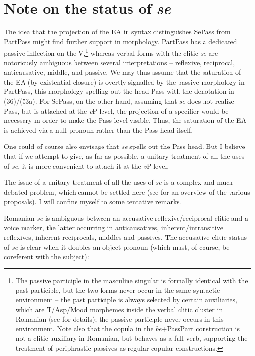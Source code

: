\documentclass[output=paper]{langsci/langscibook}
\begin{document}
\section{Note on the status of \textit{se}}%
The idea that the projection of the EA in syntax distinguishes SePass from PartPass might find further support in morphology. PartPass has a dedicated passive inflection on the V,\footnote{The passive participle in the masculine singular is formally identical with the past participle, but the two forms never occur in the same syntactic environment – the past participle is always selected by certain auxiliaries, which are T\slash Asp\slash Mood morphemes inside the verbal clitic cluster in Romanian (see \citet{Dobrovie-Sorin1994} for details); the passive participle never occurs in this environment. Note also that the copula in the \textit{be}+PassPart construction is not a clitic auxiliary in Romanian, but behaves as a full verb, supporting the treatment of periphrastic passives as regular copular constructions.}  whereas verbal forms with the clitic \textit{se} are notoriously ambiguous between several interpretations – reflexive, reciprocal, anticausative, middle, and passive. We may thus assume that the saturation of the EA (by existential closure) is overtly signalled by the passive morphology in PartPass, this morphology spelling out the head Pass with the denotation in (36)/(53a). For SePass, on the other hand, assuming that \textit{se} does not realize Pass, but is attached at the \textit{v}P-level, the projection of a specifier would be necessary in order to make the Pass-level visible. Thus, the saturation of the EA is achieved via a null pronoun rather than the Pass head itself.

One could of course also envisage that \textit{se} spells out the Pass head. But I believe that if we attempt to give, as far as possible, a unitary treatment of all the uses of \textit{se}, it is more convenient to  attach it at the \textit{v}P-level.

The issue of a unitary treatment of all the uses of \textit{se} is a complex and much-debated problem, which cannot be settled here (see \citealt{Dobrovie-Sorin2017} for an overview of the various proposals). I will confine myself to some tentative remarks.

Romanian \textit{se} is ambiguous between an accusative reflexive\slash reciprocal clitic and a voice marker, the latter occurring in anticausatives, inherent\slash intransitive reflexives, inherent reciprocals, middles and passives. The accusative clitic status of \textit{se} is clear when it doubles an object pronoun (which must, of course, be coreferent with the subject):
\end{document}
